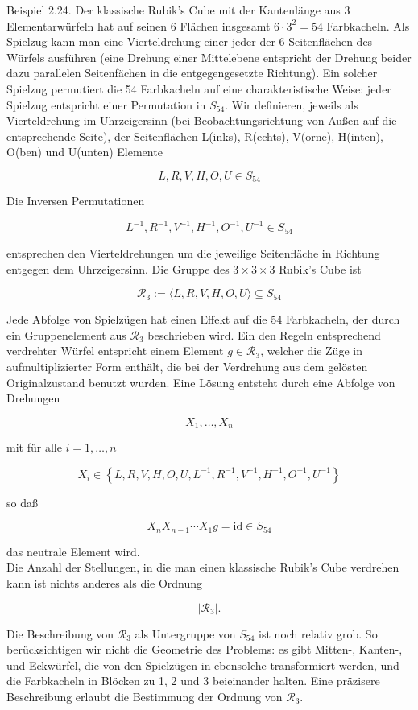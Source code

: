 \documentclass[10pt, letterpaper]{article}
\begin{document}
Beispiel 2.24. Der klassische Rubik's Cube mit der Kantenlänge aus 3 Elementarwürfeln hat auf seinen 6 Flächen insgesamt $6 \cdot 3^{2}=54$ Farbkacheln. Als Spielzug kann man eine Vierteldrehung einer jeder der 6 Seitenflächen des Würfels ausführen (eine Drehung einer Mittelebene entspricht der Drehung beider dazu parallelen Seitenfächen in die entgegengesetzte Richtung). Ein solcher Spielzug permutiert die 54 Farbkacheln auf eine charakteristische Weise: jeder Spielzug entspricht einer Permutation in $S_{54}$. Wir definieren, jeweils als Vierteldrehung im Uhrzeigersinn (bei Beobachtungsrichtung von Außen auf die entsprechende Seite), der Seitenflächen L(inks), R(echts), V(orne), H(inten), O(ben) und U(unten) Elemente

$$
L, R, V, H, O, U \in S_{54}
$$

Die Inversen Permutationen

$$
L^{-1}, R^{-1}, V^{-1}, H^{-1}, O^{-1}, U^{-1} \in S_{54}
$$

entsprechen den Vierteldrehungen um die jeweilige Seitenfläche in Richtung entgegen dem Uhrzeigersinn. Die Gruppe des $3 \times 3 \times 3$ Rubik's Cube ist

$$
\mathscr{R}_{3}:=\langle L, R, V, H, O, U\rangle \subseteq S_{54}
$$

Jede Abfolge von Spielzügen hat einen Effekt auf die 54 Farbkacheln, der durch ein Gruppenelement aus $\mathscr{R}_{3}$ beschrieben wird. Ein den Regeln entsprechend verdrehter Würfel entspricht einem Element $g \in \mathscr{R}_{3}$, welcher die Züge in aufmultiplizierter Form enthält, die bei der Verdrehung aus dem gelösten Originalzustand benutzt wurden. Eine Lösung entsteht durch eine Abfolge von Drehungen

$$
X_{1}, \ldots, X_{n}
$$

mit für alle $i=1, \ldots, n$

$$
X_{i} \in\left\{L, R, V, H, O, U, L^{-1}, R^{-1}, V^{-1}, H^{-1}, O^{-1}, U^{-1}\right\}
$$

so daß

$$
X_{n} X_{n-1} \cdots X_{1} g=\mathrm{id} \in S_{54}
$$

das neutrale Element wird.\\
Die Anzahl der Stellungen, in die man einen klassische Rubik's Cube verdrehen kann ist nichts anderes als die Ordnung

$$
\left|\mathscr{R}_{3}\right| .
$$

Die Beschreibung von $\mathscr{R}_{3}$ als Untergruppe von $S_{54}$ ist noch relativ grob. So berücksichtigen wir nicht die Geometrie des Problems: es gibt Mitten-, Kanten-, und Eckwürfel, die von den Spielzügen in ebensolche transformiert werden, und die Farbkacheln in Blöcken zu 1, 2 und 3 beieinander halten. Eine präzisere Beschreibung erlaubt die Bestimmung der Ordnung von $\mathscr{R}_{3}$.
\end{document}
